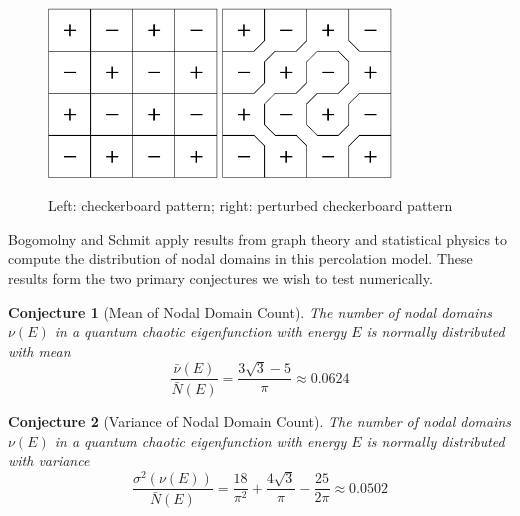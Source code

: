 \documentclass{report}
\begin{document}
\begin{figure}
  \begin{center}
    \includegraphics[width=0.4\textwidth]{figs/percolation/checkerboard.eps}
    \hspace{1 cm}
    \includegraphics[width=0.4\textwidth]{figs/percolation/perturbed.eps}
    \caption{Left: checkerboard pattern; right: perturbed checkerboard pattern}
    \label{fig:percolation}
  \end{center}
\end{figure}

Bogomolny and Schmit apply results from graph theory and statistical physics to compute the distribution of nodal domains in this percolation model. These results form the two primary conjectures we wish to test numerically.

\newtheorem{conj}{Conjecture}
\begin{conj}[Mean of Nodal Domain Count]
  \label{conj:mean_prediction}
  The number of nodal domains $\nu(E)$ in a quantum chaotic eigenfunction with energy $E$ is normally distributed with mean
  \begin{equation}
    \frac{\bar{\nu}(E)}{\bar{N}(E)} = \frac{3 \sqrt{3} - 5}{\pi} \approx 0.0624
  \end{equation}
\end{conj}

\begin{conj}[Variance of Nodal Domain Count]
  \label{conj:variance_prediction}
  The number of nodal domains $\nu(E)$ in a quantum chaotic eigenfunction with energy $E$ is normally distributed with variance
  \begin{equation}
    \frac{\sigma^{2}(\nu(E))}{\bar{N}(E)} = \frac{18}{\pi^{2}} + \frac{4 \sqrt{3}}{\pi} - \frac{25}{2 \pi} \approx 0.0502
  \end{equation}
\end{conj}  
\end{document}

